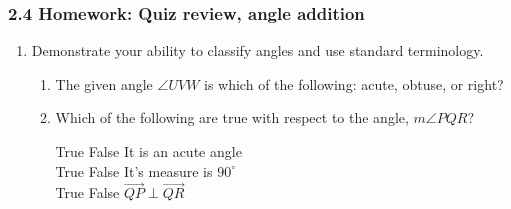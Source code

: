 

\fancyhead[LE]{\thepage}



\subsubsection*{2.4 Homework: Quiz review, angle addition}
\begin{enumerate}
\item Demonstrate your ability to classify angles and use standard terminology.
\begin{enumerate}
\item The given angle $\angle UVW$ is which of the following: acute, obtuse, or right?
  \begin{center}
  \end{center}
  \item Which of the following are true with respect to the angle, $m\angle PQR$?
  \begin{multicols}{2}
    True \hspace{0.25cm} False \hspace{0.25cm} It is an acute angle \\[0.5cm]
    True \hspace{0.25cm} False \hspace{0.25cm} It's measure is $90^\circ$\\[0.5cm]
    True \hspace{0.25cm} False \hspace{0.25cm} $\overrightarrow{QP} \perp \overrightarrow{QR}$ \\[0.5cm]
    \columnbreak
\end{multicols}
\end{enumerate}
\end{enumerate}
